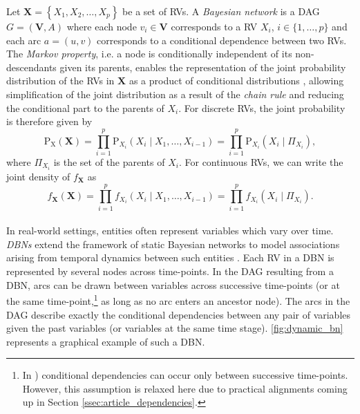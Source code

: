 
Let $\mathbf{X}=\left\{X_{1}, X_{2}, \ldots, X_{p}\right\}$ be a set of \acp{RV}. A \textit{Bayesian network} is a \ac{DAG} $G = (\bm{V},A)$ where each node $v_i \in \bm{V}$ corresponds to a \ac{RV} $X_i$, $i \in \{1, \ldots, p\}$ and each arc $a = (u,v)$ corresponds to a conditional dependence between two \acp{RV}. The \textit{Markov property}, i.e. a node is conditionally independent of its non-descendants given its parents, enables the representation of the joint probability distribution of the \acp{RV} in $\bm{X}$ as a product of conditional distributions \citep{nagarajan2013bayesian}, allowing simplification of the joint distribution as a result of the \textit{chain rule} and reducing the conditional part to the parents of $X_i$. For discrete \acp{RV}, the joint probability is therefore given by 
\begin{equation}
\mathrm{P}_{\bm{\mathrm{X}}}(\mathbf{X})=
\prod_{i=1}^{p} \mathrm{P}_{X_i}\left(X_{i} \mid X_{1}, \ldots, X_{i-1}\right) =
\prod_{i=1}^{p} \mathrm{P}_{X_{i}}\left(X_{i} \mid \Pi_{X_{i}}\right),
\end{equation}
where $\Pi_{X_{i}}$ is the set of the parents of $X_i$. For continuous \acp{RV}, we can write the joint density of $f_{\mathbf{X}}$ as
\begin{equation}
f_{\mathbf{X}}(\mathbf{X})=
\prod_{i=1}^{p} f_{X_i}\left(X_{i} \mid X_{1}, \ldots, X_{i-1}\right) =
\prod_{i=1}^{p} f_{X_{i}}\left(X_{i} \mid \Pi_{X_{i}}\right).
\end{equation}
\\

In real-world settings, entities often represent variables which vary over time. \textit{\acp{DBN}} extend the framework of static Bayesian networks to model associations arising from temporal dynamics between such entities \citep{nagarajan2013bayesian}. Each \ac{RV} in a \ac{DBN} is represented by several nodes across time-points. In the \ac{DAG} resulting from a \ac{DBN}, arcs can be drawn between variables across successive time-points (or at the same time-point,\footnote{In \cite{nagarajan2013bayesian}) conditional dependencies can occur only between successive time-points. However, this assumption is relaxed here due to practical alignments coming up in Section \ref{ssec:article_dependencies}.} as long as no arc enters an ancestor node). The arcs in the \ac{DAG} describe exactly the conditional dependencies between any pair of variables given the past variables (or variables at the same time stage). \autoref{fig:dynamic_bn} represents a graphical example of such a \ac{DBN}.
\\


